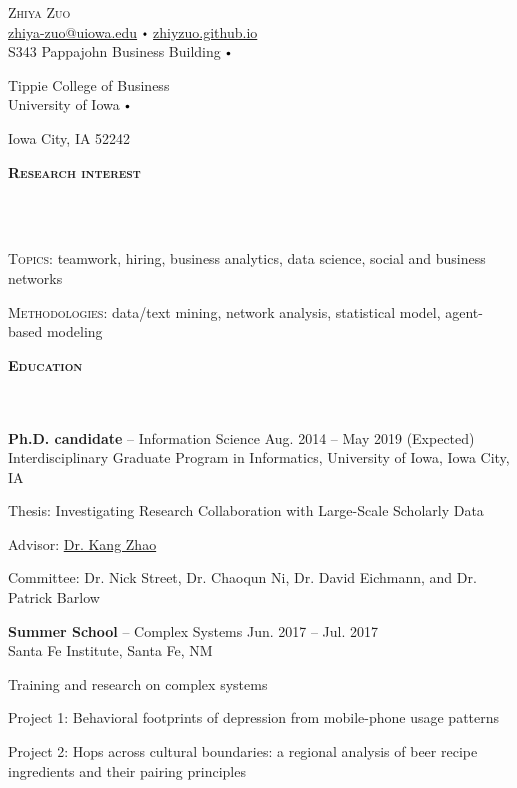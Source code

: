 \documentclass{article}
\newcommand{\contact}[3]{
\vspace*{5pt}
\begin{center}
{\LARGE \scshape {#1}}\\
\vspace{3pt}
#2 
\vspace{2pt}
#3
\end{center}
\vspace*{-8pt}
}
\newcommand{\header}[1]{{
\hspace*{-15pt}\vspace*{6pt} \textbf{\textsc{\large{#1}}}} \vspace*{-6pt} 
\lineunder
}
\newcommand{\lineunder}{
\vspace*{-8pt} \\ \hspace*{-15pt} 
\hrulefill \\
}
\newcommand{\employer}[4]{{
\vspace*{2pt}%
\textbf{#1} #2 \hfill #3\\ #4 \vspace*{2pt}}
}
\renewcommand{\labelitemi}{
$\vcenter{\hbox{\tiny$\bullet$}}$\hspace*{3pt}
}
\renewcommand{\labelitemii}{
$\vcenter{\hbox{\tiny$\bullet$}}$\hspace*{-3pt}
}
\newenvironment{bullet-list-major}{
\begin{list}{\labelitemii}{\setlength\leftmargin{3pt} 
\topsep 0pt \itemsep -2pt}}{\vspace*{4pt}\end{list}
}
\newenvironment{bullet-list-minor}{
\begin{list}{\labelitemii}{\setlength\leftmargin{15pt} 
\topsep 0pt \itemsep -2pt}}{\vspace*{4pt}\end{list}
}
\begin{document}
\small
\smallskip
\vspace*{-44pt}

\contact{Zhiya Zuo}
{\href{mailto:zhiya-zuo@uiowa.edu}{zhiya-zuo@uiowa.edu} \labelitemi \href{https://zhiyzuo.github.io}{zhiyzuo.github.io}\\}
{S343 Pappajohn Business Building \labelitemi
 Tippie College of Business \\
 University of Iowa \labelitemi
 Iowa City, IA 52242\\%
}

\vspace{15pt}
\header{Research interest}
\begin{bullet-list-major}
    \item \textsc{Topics}: teamwork, hiring, business analytics, data science, social and business networks
    \item \textsc{Methodologies}: data/text mining, network analysis, statistical model, agent-based modeling
\end{bullet-list-major}

\vspace*{4pt}%
\header{Education}
    \employer{Ph.D. candidate}{-- Information Science}{Aug. 2014 -- May 2019 (Expected)}{Interdisciplinary Graduate Program in Informatics, University of Iowa, Iowa City, IA}
	\begin{bullet-list-minor}
    	\item Thesis: Investigating Research Collaboration with Large-Scale Scholarly Data
        \item Advisor: \href{www.kangzhao.net}{Dr. Kang Zhao}
        \item Committee: Dr. Nick Street, Dr. Chaoqun Ni, Dr. David Eichmann, and Dr. Patrick Barlow
    \end{bullet-list-minor}
    
    \employer{Summer School}{-- Complex Systems}{Jun. 2017 -- Jul. 2017}{Santa Fe Institute, Santa Fe, NM}
	\begin{bullet-list-minor}
    	\item Training and research on complex systems
        \item Project 1: Behavioral footprints of depression from mobile-phone usage patterns 
        \item Project 2: Hops across cultural boundaries: a regional analysis of beer recipe ingredients and their pairing principles
    \end{bullet-list-minor}
    
\end{document}
